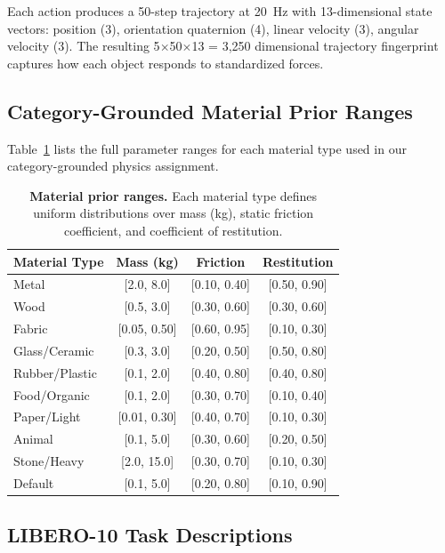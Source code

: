 \documentclass{article}
\begin{document}
Each action produces a 50-step trajectory at 20~Hz with 13-dimensional state vectors: position (3), orientation quaternion (4), linear velocity (3), angular velocity (3). The resulting 5$\times$50$\times$13 = 3,250 dimensional trajectory fingerprint captures how each object responds to standardized forces.

\subsection{Category-Grounded Material Prior Ranges}
\label{app:priors}

Table~\ref{tab:material_priors} lists the full parameter ranges for each material type used in our category-grounded physics assignment.

\begin{table}[h]
\centering
\caption{\textbf{Material prior ranges.} Each material type defines uniform distributions over mass (kg), static friction coefficient, and coefficient of restitution.}
\label{tab:material_priors}
\small
\begin{tabular}{@{}lccc@{}}
\toprule
\textbf{Material Type} & \textbf{Mass (kg)} & \textbf{Friction} & \textbf{Restitution} \\
\midrule
Metal        & [2.0, 8.0]    & [0.10, 0.40] & [0.50, 0.90] \\
Wood         & [0.5, 3.0]    & [0.30, 0.60] & [0.30, 0.60] \\
Fabric       & [0.05, 0.50]  & [0.60, 0.95] & [0.10, 0.30] \\
Glass/Ceramic& [0.3, 3.0]    & [0.20, 0.50] & [0.50, 0.80] \\
Rubber/Plastic& [0.1, 2.0]   & [0.40, 0.80] & [0.40, 0.80] \\
Food/Organic & [0.1, 2.0]    & [0.30, 0.70] & [0.10, 0.40] \\
Paper/Light  & [0.01, 0.30]  & [0.40, 0.70] & [0.10, 0.30] \\
Animal       & [0.1, 5.0]    & [0.30, 0.60] & [0.20, 0.50] \\
Stone/Heavy  & [2.0, 15.0]   & [0.30, 0.70] & [0.10, 0.30] \\
Default      & [0.1, 5.0]    & [0.20, 0.80] & [0.10, 0.90] \\
\bottomrule
\end{tabular}
\end{table}


\subsection{LIBERO-10 Task Descriptions}
\label{app:libero_tasks}
\end{document}
